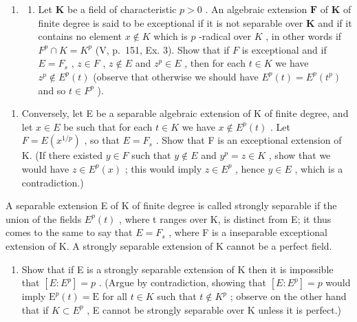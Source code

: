 \BourbakiExerciseGroup

\begin{enumerate}
\def\labelenumi{\arabic{enumi})}
\tightlist
\item
  \begin{enumerate}
  \def\labelenumii{\alph{enumii})}
  \tightlist
  \item
    Let \(\mathbf{K}\) be a field of characteristic \(p > 0\) . An algebraic extension \(\mathbf{F}\) of \(\mathbf{K}\) of finite degree is said to be exceptional if it is not separable over \(\mathbf{K}\) and if it contains no element \(x \notin K\) which is \(p\) -radical over \(K\) , in other words if \(F^p \cap K = K^p\) (V, p.~151, Ex. 3). Show that if \(F\) is exceptional and if \(E = F_s\) , \(z \in F\) , \(z \notin E\) and \(z^p \in E\) , then for each \(t \in K\) we have \(z^p \notin E^p(t)\) (observe that otherwise we should have \(E^p(t) = E^p(t^p)\) and so \(t \in F^p\) ).
  \end{enumerate}
\end{enumerate}

\begin{enumerate}
\def\labelenumi{\alph{enumi})}
\setcounter{enumi}{1}
\tightlist
\item
  Conversely, let E be a separable algebraic extension of K of finite degree, and let \(x \in E\) be such that for each \(t \in K\) we have \(x \notin E^p(t)\) . Let \(F = E(x^{1/p})\) , so that \(E = F_s\) . Show that F is an exceptional extension of K. (If there existed \(y \in F\) such that \(y \notin E\) and \(y^p = z \in K\) , show that we would have \(z \in E^p(x)\) ; this would imply \(z \in E^p\) , hence \(y \in E\) , which is a contradiction.)
\end{enumerate}

A separable extension E of K of finite degree is called strongly separable if the union of the fields \(E^{p}(t)\) , where t ranges over K, is distinct from E; it thus comes to the same to say that \(E = F_{s}\) , where F is a inseparable exceptional extension of K. A strongly separable extension of K cannot be a perfect field.

\begin{enumerate}
\def\labelenumi{\alph{enumi})}
\setcounter{enumi}{2}
\tightlist
\item
  Show that if E is a strongly separable extension of K then it is impossible that \([E:E^{p}]=p\) . (Argue by contradiction, showing that \([E:E^{p}]=p\) would imply \(\mathrm{E}^{p}(t)=\mathrm{E}\) for all \(t\in K\) such that \(t\notin K^{p}\) ; observe on the other hand that if \(K\subset E^{p}\) , E cannot be strongly separable over K unless it is perfect.)
\end{enumerate}

